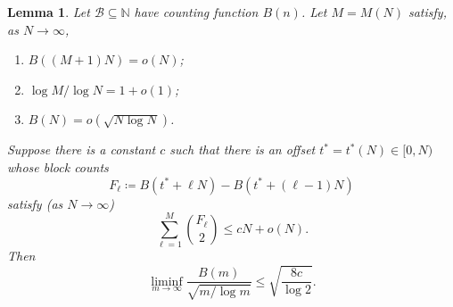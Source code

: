 \documentclass[10pt]{article}
\newcommand{\NN}{\ensuremath{\mathbb N}}
\newcommand{\cB}{\mathcal{B}}
\newtheorem{lem}[thm]{Lemma}
\begin{document}
\begin{lem}\label{lem:energy}
Let $\cB\subseteq\NN$ have counting function $B(n)$.
Let $M=M(N)$ satisfy, as $N\to\infty$,
\begin{enumerate}[label=\textit{(\roman*)},noitemsep]
  \item\label{eng:window} $B((M+1)N)=o(N)$;
  \item\label{eng:ratio} $\log M/\log N =1+o( 1 )$;
  \item\label{eng:head} $B(N)=o(\sqrt{N \log N})$.
\end{enumerate}
Suppose there is a constant $c$ such that there is an
offset $t^\ast=t^\ast(N)\in[0,N)$ whose block counts
  \begin{equation*}\label{hyp:blocks}
    F_\ell \coloneqq B(t^\ast+\ell N)- B(t^\ast+(\ell-1)N)
  \end{equation*}
satisfy (as $N\to\infty$)
  \begin{equation}\label{hyp:energy}
    \sum_{\ell=1}^{M}\binom{F_\ell}{2}\le cN+o(N).
  \end{equation}
Then
  \[\liminf_{m\to\infty}\frac{B(m)}{\sqrt{m/\log m}}\le \sqrt{\frac{8c}{\log 2}}.\]
\end{lem}
\end{document}
